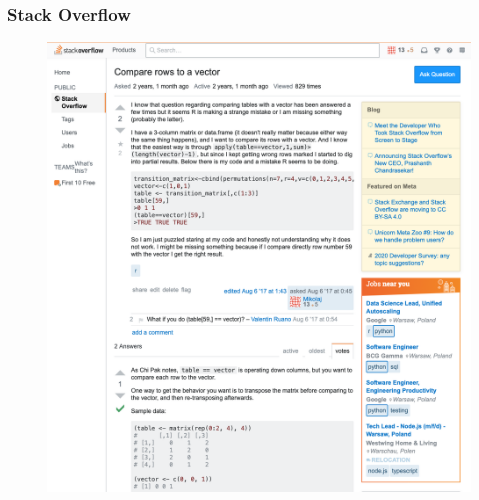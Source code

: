 \begin{frame}
    \frametitle{Stack Overflow}
    \begin{overprint}
        \onslide<+>
            \begin{figure}
                \centering
                \includegraphics[scale = .3]{png/stack_overflow.png}
            \end{figure}
        \onslide<+>
            \begin{figure}
                \centering

\end{figure}
\end{overprint}
\end{frame}
